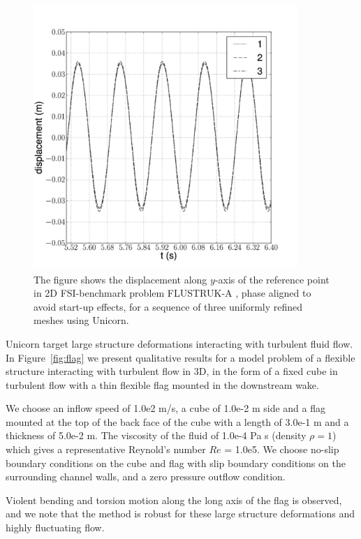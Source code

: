 \begin{figure}
\center\includegraphics[width=10cm]{chapters/hoffman-1/png/fsi_bench3D_displacement_aligned.pdf}

\caption{The figure shows the displacement along $y$-axis
of the reference point in 2D FSI-benchmark problem FLUSTRUK-A
\citep{HoffmanJanssonStockli2011}, phase aligned to avoid start-up
effects, for a sequence of three uniformly refined meshes using Unicorn.}
\label{fig:flustruk}
\end{figure}

Unicorn target large structure deformations interacting with turbulent
fluid flow. In Figure~\ref{fig:flag} we present qualitative results for
a model problem of a flexible structure interacting with turbulent flow
in 3D, in the form of a fixed cube in turbulent flow with a thin flexible
flag mounted in the downstream wake.

We choose an inflow speed of 1.0e2 m/s, a cube of 1.0e-2 m side and a flag
mounted at the top of the back face of the cube with a length of 3.0e-1
m and a thickness of 5.0e-2 m. The viscosity of the fluid of 1.0e-4 Pa s
(density $\rho=1$) which gives a representative Reynold's number $Re$ =
1.0e5. We choose no-slip boundary conditions on the cube and flag with
slip boundary conditions on the surrounding channel walls, and a zero
pressure outflow condition.

Violent bending and torsion motion along the long axis of the flag is
observed, and we note that the method is robust for these large structure
deformations and highly fluctuating flow.

